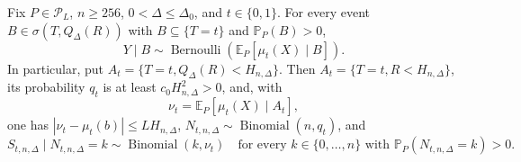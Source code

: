 Fix \(P\in\mathcal P_L\), \(n\geq256\), \(0<\Delta\leq\Delta_0\), and \(t\in\{0,1\}\).  For every event \(B\in\sigma(T,Q_\Delta(R))\) with \(B\subseteq\{T=t\}\) and \(\mathbb P_P(B)>0\),
\[
 Y\mid B\sim\operatorname{Bernoulli}\!\left(\mathbb E_P[\mu_t(X)\mid B]\right).
\]
In particular, put \(A_t=\{T=t,Q_\Delta(R)<H_{n,\Delta}\}\).  Then \(A_t=\{T=t,R<H_{n,\Delta}\}\), its probability \(q_t\) is at least \(c_0H_{n,\Delta}^2>0\), and, with
\[
 \nu_t=\mathbb E_P[\mu_t(X)\mid A_t],
\]
one has \(|\nu_t-\mu_t(b)|\leq LH_{n,\Delta}\), \(N_{t,n,\Delta}\sim\operatorname{Binomial}(n,q_t)\), and
\[
 S_{t,n,\Delta}\mid N_{t,n,\Delta}=k
 \sim\operatorname{Binomial}(k,\nu_t)
 \quad\text{for every }k\in\{0,\ldots,n\}\text{ with }\mathbb P_P(N_{t,n,\Delta}=k)>0.
\]